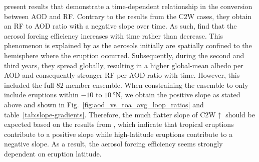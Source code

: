 \documentclass[draft]{agujournal2019}
\newcommand{\cwsn}{C2W\(\uparrow\)}
\begin{document}
 present results that demonstrate a
time-dependent relationship in the conversion between AOD and RF. Contrary
to the results from the C2W cases, they obtain an RF to AOD ratio with
a negative slope over time. As such,  find that the aerosol forcing
efficiency increases with time rather than decrease. This phenomenon is explained by
 as the aerosols initially are spatially confined to the hemisphere
where the eruption occurred. Subsequently, during the second and third years, they
spread globally, resulting in a higher global-mean albedo per AOD and consequently
stronger RF per AOD ratio with time. However, this included the full
\(82\)-member ensemble. When constraining the ensemble to only include eruptions within
\(-10\) to \(\SI{10}{\degree\mathrm{N}}\), we obtain the positive slope as stated above
and shown in Fig.~\ref{fig:aod_vs_toa_avg_loop_ratios} and
table~\ref{tab:slope-gradients}. Therefore, the much flatter slope of \cwsn{} should
be expected based on the results from , which indicate that tropical
eruptions contribute to a positive slope while high-latitude eruptions contribute to a
negative slope. As a result, the aerosol forcing efficiency seems strongly dependent on
eruption latitude.
\end{document}
